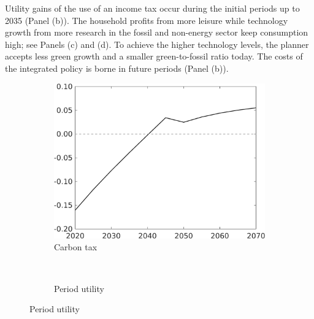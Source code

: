 Utility gains of the use of an income tax occur during the initial periods up to 2035 (Panel (b)). 
The household profits from more leisure while technology growth from more research in the fossil and non-energy sector keep consumption high; see Panels (c) and (d). 
To achieve the higher technology levels, the planner accepts less green growth and a smaller green-to-fossil ratio today. %
The costs of the integrated policy is borne in future periods (Panel (b)). 
\begin{figure}[h!!!]
	\centering
	\caption{Deviation from optimal policy with only a carbon tax}\label{fig:opt_TLs}
	\begin{subfigure}{0.4\textwidth}
		\caption{ Carbon tax}
		\includegraphics[width=1\textwidth]{../../codding_model/own_basedOnFried/optimalPol_010922_revision/figures/all_13Sept22_Tplus30/Tauf_OPT_T_NoTaus_COMPtaulPer_regime4_spillover0_knspil0_noskill0_sep0_xgrowth0_PV1_etaa0.79.png}
	\end{subfigure}
\begin{minipage}[]{0.1\textwidth}
\
\end{minipage}
	\begin{subfigure}{0.4\textwidth}
	\caption{Period utility}

\end{subfigure}
\end{figure}
